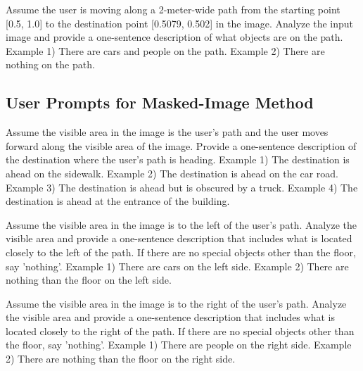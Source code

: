 \begin{tcolorbox}[
colback=red!10!white, 
colframe=red!50!black, 
rounded corners, 
boxrule=0.5mm, 
title=User prompt for path description,
width=\columnwidth]
Assume the user is moving along a 2-meter-wide path from the starting point [0.5, 1.0] to the destination point [0.5079, 0.502] in the image. Analyze the input image and provide a one-sentence description of what objects are on the path. Example 1) There are cars and people on the path. Example 2) There are nothing on the path. 
\end{tcolorbox}



\subsection{User Prompts for Masked-Image Method}

\begin{tcolorbox}[
colback=green!10!white, 
colframe=green!50!black, 
rounded corners, 
boxrule=0.5mm, 
title=User prompt for destination description,
width=\columnwidth]
Assume the visible area in the image is the user's path and the user moves forward along the visible area of the image. Provide a one-sentence description of the destination where the user's path is heading. Example 1) The destination is ahead on the sidewalk. Example 2) The destination is ahead on the car road. Example 3) The destination is ahead but is obscured by a truck. Example 4) The destination is ahead at the entrance of the building. 
\end{tcolorbox}

\begin{tcolorbox}[
colback=green!10!white, 
colframe=green!50!black, 
rounded corners, 
boxrule=0.5mm, 
title=User prompt for left description,
width=\columnwidth]
Assume the visible area in the image is to the left of the user's path. Analyze the visible area and provide a one-sentence description that includes what is located closely to the left of the path. If there are no special objects other than the floor, say 'nothing'. Example 1) There are cars on the left side. Example 2) There are nothing than the floor on the left side. 
\end{tcolorbox}

\begin{tcolorbox}[
colback=green!10!white, 
colframe=green!50!black, 
rounded corners, 
boxrule=0.5mm, 
title=User prompt for right description,
width=\columnwidth]
Assume the visible area in the image is to the right of the user's path. Analyze the visible area and provide a one-sentence description that includes what is located closely to the right of the path. If there are no special objects other than the floor, say 'nothing'. Example 1) There are people on the right side. Example 2) There are nothing than the floor on the right side. 
\end{tcolorbox}

